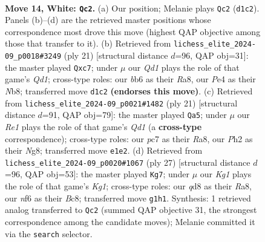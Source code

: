 \documentclass[11pt]{article}
\begin{document}
\clearpage

\begin{figure}[p]\centering
\begin{subfigure}{0.46\textwidth}\centering
\resizebox{\linewidth}{!}{%
\newchessgame
\chessboard[
  setfen={r2q4/1bp2kpp/pb1p1n2/1p2n3/4P3/2P5/PP3PPP/RNBQR1K1 w - - 0 14},
  showmover=false,
  pgfstyle=straightmove, color=movearrow, markmove={d1-c2}
]}
\caption{}
\end{subfigure}\hfill
\begin{subfigure}{0.46\textwidth}\centering
\resizebox{\linewidth}{!}{%
\newchessgame
\chessboard[
  setfen={rnbq1rk1/p1N2pp1/1p2p2p/8/3P4/4PN2/PP3KPP/R2Q1B1R b - - 0 11},
  showmover=false,
  pgfstyle=straightmove, color=movearrow, markmove={d8-c7}
]}
\caption{}
\end{subfigure}
\\[4pt]
\begin{subfigure}{0.46\textwidth}\centering
\resizebox{\linewidth}{!}{%
\newchessgame
\chessboard[
  setfen={r2q1knr/pp3ppp/8/4Nb2/1nPp4/1P1P2P1/P4PBP/RN1QK2R b KQ - 0 11},
  showmover=false,
  pgfstyle=straightmove, color=movearrow, markmove={d8-a5}
]}
\caption{}
\end{subfigure}\hfill
\begin{subfigure}{0.46\textwidth}\centering
\resizebox{\linewidth}{!}{%
\newchessgame
\chessboard[
  setfen={r1b1rnk1/pp3p2/2pq1ppp/8/3P4/2PB3P/PPQ1NPP1/R3R1K1 b - - 1 14},
  showmover=false,
  pgfstyle=straightmove, color=movearrow, markmove={g8-g7}
]}
\caption{}
\end{subfigure}
\caption{\textbf{Move 14, White: \texttt{Qc2}.} (a) Our position; Melanie plays \texttt{Qc2} (\texttt{d1c2}). Panels (b)--(d) are the retrieved master positions whose correspondence most drove this move (highest QAP objective among those that transfer to it). (b) Retrieved from \texttt{lichess\_elite\_2024-09\_p0018\#3249} (ply 21) [structural distance $d$=96, QAP obj=31]: the master played \texttt{Qxc7}; under $\mu$ our \emph{Qd1} plays the role of that game's \emph{Qd1}; cross-type roles: our \emph{b}b6 as their \emph{R}a8, our \emph{P}e4 as their \emph{N}b8; transferred move \texttt{d1c2} \textbf{(endorses this move)}. (c) Retrieved from \texttt{lichess\_elite\_2024-09\_p0021\#1482} (ply 21) [structural distance $d$=91, QAP obj=79]: the master played \texttt{Qa5}; under $\mu$ our \emph{Re1} plays the role of that game's \emph{Qd1} (a \textbf{cross-type} correspondence); cross-type roles: our \emph{p}c7 as their \emph{R}a8, our \emph{P}h2 as their \emph{N}g8; transferred move \texttt{e1e2}. (d) Retrieved from \texttt{lichess\_elite\_2024-09\_p0020\#1067} (ply 27) [structural distance $d$=96, QAP obj=53]: the master played \texttt{Kg7}; under $\mu$ our \emph{Kg1} plays the role of that game's \emph{Kg1}; cross-type roles: our \emph{q}d8 as their \emph{R}a8, our \emph{n}f6 as their \emph{B}c8; transferred move \texttt{g1h1}. Synthesis: 1 retrieved analog transferred to \texttt{Qc2} (summed QAP objective 31, the strongest correspondence among the candidate moves); Melanie committed it via the \texttt{search} selector.}
\label{fig:thought-m26}
\end{figure}
\end{document}
